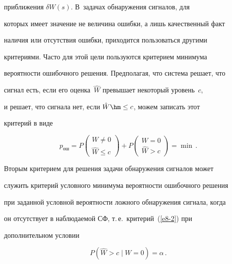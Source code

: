 приближения $\delta W(s)$. В~задачах обнаружения сигналов, для


которых имеет значение не величина ошибки, а лишь качественный факт


наличия или отсутствия ошибки, приходится пользоваться другими


критериями. Часто для этой цели пользуются критерием минимума


вероятности ошибочного решения. Предполагая, что система решает, что


сигнал есть, если его оценка~$\hat W$ превышает некоторый уровень~$c$,


и решает, что сигнала нет, если  $\hat W\hm\le c$, можем записать этот


критерий в виде


    \begin{equation}


    p_{\mathrm{ош}} = P


    \begin{pmatrix}


    W\ne 0\\ \hat W \le c


    \end{pmatrix} + P 


    \begin{pmatrix}


    W= 0\\ 


    \hat W > c


    \end{pmatrix}


    =\min\,.


    \label{e8-2}


    \end{equation}


Вторым критерием для решения задачи обнаружения сигналов может


служить критерий условного минимума вероятности ошибочного решения


при заданной условной вероятности ложного обнаружения сигнала, когда


он отсутствует в наблюдаемой СФ, т.\,е.\ критерий~(\ref{e8-2}) при


дополнительном условии


\begin{equation}


P(\hat W >c \mid W=0)=\alpha\,.\label{e9-2}


\end{equation}


